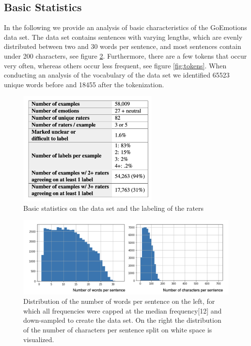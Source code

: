 \documentclass[a4paper]{article}
\begin{document}
\subsection{Basic Statistics}

In the following we provide an analysis of basic characteristics of the GoEmotions data set. The data set contains sentences with varying lengths, which are evenly distributed between two and 30 words per sentence, and most sentences contain under 200 characters, see figure  \ref{fig:chars_words_dist}. Furthermore, there are a few tokens that occur very often, whereas others occur less frequent, see figure \ref{fig:tokens}. When conducting an analysis of the vocabulary of the data set we identified 65523 unique words before and 18455 after the tokenization.

\begin{figure}[H]
\centering
\includegraphics[width=7cm]{statistics}
\caption{Basic statistics on the data set and the labeling of the raters}
\label{fig:statistics}
\end{figure}

\begin{figure}[H]
\centering
\includegraphics[width=15cm]{chars_words_dist}
\caption{Distribution of the number of words per sentence on the left, for which all frequencies were capped at the median frequency[12] and down-sampled to create the data set. On the right the distribution of the number of characters per sentence split on white space is visualized.}
\label{fig:chars_words_dist}
\end{figure}
\end{document}
